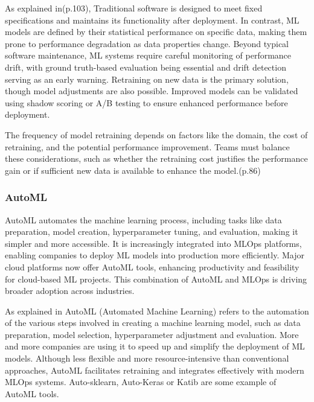 As explained in\cite{treveil2020introducing}(p.103), Traditional software is designed to meet fixed specifications and maintains its functionality after deployment.
In contrast, ML models are defined by their statistical performance on specific data, making them prone to performance degradation as data properties change.
Beyond typical software maintenance, ML systems require careful monitoring of performance drift,
with ground truth-based evaluation being essential and drift detection serving as an early warning.
Retraining on new data is the primary solution, though model adjustments are also possible.
Improved models can be validated using shadow scoring or A/B testing to ensure enhanced performance before deployment.

The frequency of model retraining depends on factors like the domain, the cost of retraining, and the potential performance improvement.
Teams must balance these considerations, such as whether the retraining cost justifies the performance gain or if sufficient new data is available to enhance the model.\cite{treveil2020introducing}(p.86)

\subsubsection{AutoML}

AutoML automates the machine learning process, including tasks like data preparation, model creation, hyperparameter tuning, and evaluation,
making it simpler and more accessible.
It is increasingly integrated into MLOps platforms, enabling companies to deploy ML models into production more efficiently.
Major cloud platforms now offer AutoML tools, enhancing productivity and feasibility for cloud-based ML projects.
This combination of AutoML and MLOps is driving broader adoption across industries.\cite{gift2021practical,mlops-definition-tools-and-challenge}

As explained in\cite{mlops-definition-tools-and-challenge} AutoML (Automated Machine Learning) refers to the automation of the various steps involved in creating a machine learning model,
such as data preparation, model selection, hyperparameter adjustment and evaluation.
More and more companies are using it to speed up and simplify the deployment of ML models.
Although less flexible and more resource-intensive than conventional approaches, AutoML facilitates retraining and integrates effectively with modern MLOps systems.
Auto-sklearn, Auto-Keras or Katib are some example of AutoML tools.



